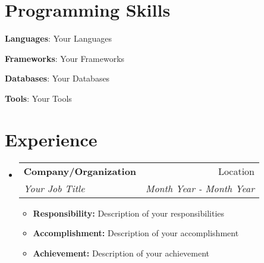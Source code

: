 \documentclass[a4paper,11pt]{article}
\makeatletter
\newcommand{\resumeItem}[2]{\item\small{\textbf{#1} #2 \vspace{-2pt}}}
\newcommand{\resumeSubheading}[4]{
  \vspace{-1pt}\item
  \begin{tabular*}{0.97\textwidth}{l@{\extracolsep{\fill}}r}
    \textbf{#1} & #2 \\
    \textit{#3} & \textit{#4} \\
  \end{tabular*}\vspace{-5pt}
}
\newcommand{\resumeSubHeadingListStart}{\begin{itemize}[leftmargin=*]}
\newcommand{\resumeSubHeadingListEnd}{\end{itemize}}
\newcommand{\resumeItemListStart}{\begin{itemize}[label={$\bullet$}, leftmargin=*]}
\newcommand{\resumeItemListEnd}{\end{itemize}\vspace{-5pt}}
\makeatother
\begin{document}
\section{\textbf{{\LARGE Programming Skills}}}
\begin{description}[font=$\bullet$]

\item{\textbf{Languages}: Your Languages}

\item{\textbf{Frameworks}: Your Frameworks}
  
\item{\textbf{Databases}: Your Databases}

\item{\textbf{Tools}: Your Tools}
\end{description}

\section{\textbf{{\LARGE Experience}}}

\resumeSubHeadingListStart

  \resumeSubheading
  {Company/Organization}{Location}
  {Your Job Title}{Month Year - Month Year}

  \resumeItemListStart
    \resumeItem{Responsibility: }
    {Description of your responsibilities}
    \resumeItem{Accomplishment: }
    {Description of your accomplishment}
    \resumeItem{Achievement: }
    {Description of your achievement}
  \resumeItemListEnd
\resumeSubHeadingListEnd

\end{document}
